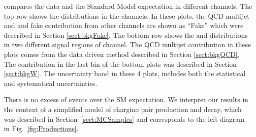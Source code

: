compares the data and the Standard Model expectation in different channels. The top row 
shows the \mttwo distributions in the \leptonTau channels. 
In these plots, the QCD multijet and \wjets and fake contribution from other channels are shown 
as ``Fake'' which were described in Section \ref{sect:bkgFake}.
The bottom row shows the \mttwo and \SumMT distributions in two different signal regions of \tauTau channel. 
The QCD multijet contribution in these plots comes from the data driven method described in 
Section \ref{sect:bkgQCD}. The \wjets contribution in the last bin of the bottom plots was described in Section \ref{sect:bkgW}. 
The uncertainty band in these 4 plots, includes both the statistical and systematical uncertainties.

There is no excess of events over the SM expectation.  We interpret our results in the context
of a simplified model of chargino pair production and decay, which was described in Section~\ref{sect:MCSamples} and corresponds 
to the left diagram in Fig.~\ref{fig:Productions}. 

